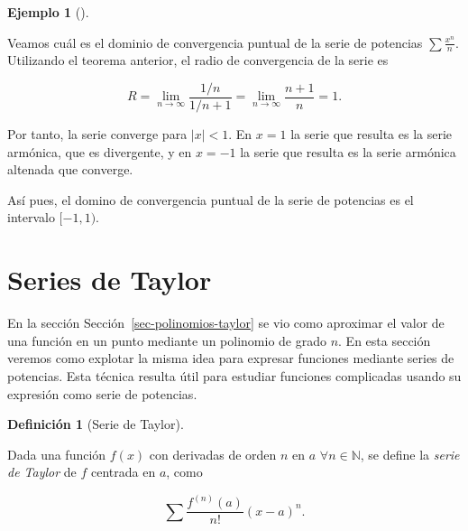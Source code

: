 \documentclass[
  a4paper,
]{scrreport}
\theoremstyle{plain}
\theoremstyle{plain}
\theoremstyle{definition}
\newtheorem{definition}{Definición}[chapter]
\theoremstyle{definition}
\newtheorem{example}{Ejemplo}[chapter]
\theoremstyle{plain}
\theoremstyle{remark}
\begin{document}
\leavevmode{}%
\begin{example}[]\label{exm-radio-convergencia-cociente}

Veamos cuál es el dominio de convergencia puntual de la serie de
potencias \(\sum \frac{x^n}{n}\). Utilizando el teorema anterior, el
radio de convergencia de la serie es

\[
R = \lim_{n\to\infty} \frac{1/n}{1/n+1} = \lim_{n\to\infty} \frac{n+1}{n} = 1.
\]

Por tanto, la serie converge para \(|x|<1\). En \(x=1\) la serie que
resulta es la serie armónica, que es divergente, y en \(x=-1\) la serie
que resulta es la serie armónica altenada que converge.

Así pues, el domino de convergencia puntual de la serie de potencias es
el intervalo \([-1,1)\).

\end{example}

\hypertarget{series-de-taylor}{%
\section{Series de Taylor}\label{series-de-taylor}}

En la sección Sección~\ref{sec-polinomios-taylor} se vio como aproximar
el valor de una función en un punto mediante un polinomio de grado
\(n\). En esta sección veremos como explotar la misma idea para expresar
funciones mediante series de potencias. Esta técnica resulta útil para
estudiar funciones complicadas usando su expresión como serie de
potencias.

\leavevmode{}%
\begin{definition}[Serie de Taylor]\label{def-serie-taylor}

Dada una función \(f(x)\) con derivadas de orden \(n\) en \(a\)
\(\forall n\in\mathbb{N}\), se define la \emph{serie de Taylor} de \(f\)
centrada en \(a\), como

\[
\sum \frac{f^{(n)}(a)}{n!}(x-a)^n.
\]

\end{definition}
\end{document}
